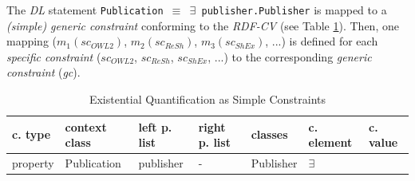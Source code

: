 \documentclass[a4paper,fontsize=11pt]{scrartcl}
\newcommand{\ms}[1]{\texttt{#1}}
\newenvironment{DL}{
  \vspace{0cm}
	\begin{center}
  \begin{tabular}{r l}

}{
  \end{tabular}
	\end{center}
}
\begin{document}


The \emph{DL} statement {\small\ms{Publication $\equiv$ $\exists$ publisher.Publisher}} is mapped to a \emph{(simple) generic constraint} conforming to the \emph{RDF-CV} (see Table \ref{tab:existential-quantification-as-simple-constraints}).
Then, one mapping (\emph{$m_1(sc_{OWL 2})$}, \emph{$m_2(sc_{ReSh})$}, \emph{$m_3(sc_{ShEx})$}, ...) is defined for each \emph{specific constraint} (\emph{$sc_{OWL 2}$}, \emph{$sc_{ReSh}$}, \emph{$sc_{ShEx}$}, ...) to the corresponding \emph{generic constraint} (\emph{gc}).



\begin{table}
  \scriptsize
  \sffamily
  \vspace{0cm}
	\caption{Existential Quantification as Simple Constraints}
	\label{tab:existential-quantification-as-simple-constraints}
	\centering
		\begin{tabular}{l|l|l|l|l|l|l}
      \textbf{c. type} & \textbf{context class} & \textbf{left p. list} & \textbf{right p. list} & \textbf{classes} & \textbf{c. element} & \textbf{c. value} \\
      \hline
property & Publication & publisher & - & Publisher & $\exists$ \\
		\end{tabular}
\end{table}
\end{document}

